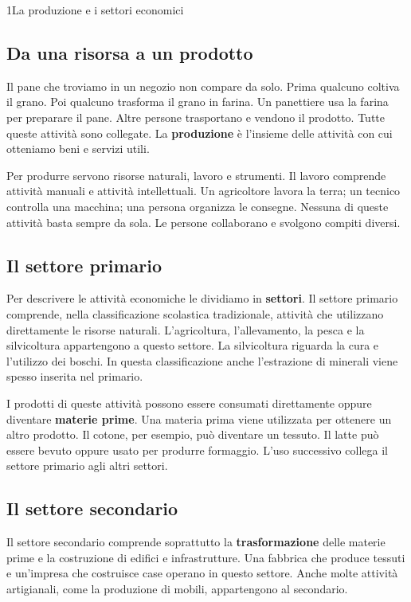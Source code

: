\begin{lettura}{1}{La produzione e i settori economici}


\subsection*{Da una risorsa a un prodotto}
Il pane che troviamo in un negozio non compare da solo. Prima qualcuno coltiva il grano. Poi qualcuno trasforma il grano in farina. Un panettiere usa la farina per preparare il pane. Altre persone trasportano e vendono il prodotto. Tutte queste attività sono collegate. La \textbf{produzione} è l'insieme delle attività con cui otteniamo beni e servizi utili.

Per produrre servono risorse naturali, lavoro e strumenti. Il lavoro comprende attività manuali e attività intellettuali. Un agricoltore lavora la terra; un tecnico controlla una macchina; una persona organizza le consegne. Nessuna di queste attività basta sempre da sola. Le persone collaborano e svolgono compiti diversi.

\subsection*{Il settore primario}
Per descrivere le attività economiche le dividiamo in \textbf{settori}. Il settore primario comprende, nella classificazione scolastica tradizionale, attività che utilizzano direttamente le risorse naturali. L'agricoltura, l'allevamento, la pesca e la silvicoltura appartengono a questo settore. La silvicoltura riguarda la cura e l'utilizzo dei boschi. In questa classificazione anche l'estrazione di minerali viene spesso inserita nel primario.

I prodotti di queste attività possono essere consumati direttamente oppure diventare \textbf{materie prime}. Una materia prima viene utilizzata per ottenere un altro prodotto. Il cotone, per esempio, può diventare un tessuto. Il latte può essere bevuto oppure usato per produrre formaggio. L'uso successivo collega il settore primario agli altri settori.

\subsection*{Il settore secondario}
Il settore secondario comprende soprattutto la \textbf{trasformazione} delle materie prime e la costruzione di edifici e infrastrutture. Una fabbrica che produce tessuti e un'impresa che costruisce case operano in questo settore. Anche molte attività artigianali, come la produzione di mobili, appartengono al secondario.


\end{lettura}
